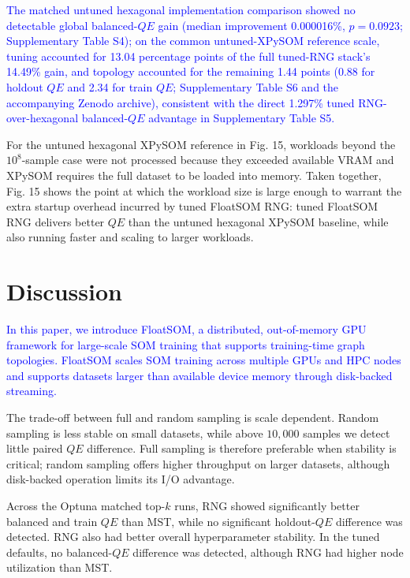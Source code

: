 \documentclass[10pt]{article} %
\newcommand{\TrackedChange}[1]{\textcolor{blue}{#1}}
\begin{document}
\TrackedChange{The matched untuned hexagonal implementation comparison showed no detectable global balanced-$QE$ gain (median improvement 0.000016\%, $p=0.0923$; Supplementary Table S4); on the common untuned-XPySOM reference scale, tuning accounted for 13.04 percentage points of the full tuned-RNG stack's 14.49\% gain, and topology accounted for the remaining 1.44 points (0.88 for holdout $QE$ and 2.34 for train $QE$; Supplementary Table S6 and the accompanying Zenodo archive), consistent with the direct 1.297\% tuned RNG-over-hexagonal balanced-$QE$ advantage in Supplementary Table S5.}

For the untuned hexagonal XPySOM reference in Fig. 15, workloads beyond the $10^8$-sample case were not processed because they exceeded available VRAM and XPySOM requires the full dataset to be loaded into memory. Taken together, Fig. 15 shows the point at which the workload size is large enough to warrant the extra startup overhead incurred by tuned FloatSOM RNG: tuned FloatSOM RNG delivers better $QE$ than the untuned hexagonal XPySOM baseline, while also running faster and scaling to larger workloads.

\section{Discussion}

\TrackedChange{In this paper, we introduce FloatSOM, a distributed, out-of-memory GPU framework for large-scale SOM training that supports training-time graph topologies. FloatSOM scales SOM training across multiple GPUs and HPC nodes and supports datasets larger than available device memory through disk-backed streaming.}

The trade-off between full and random sampling is scale dependent. Random sampling is less stable on small datasets, while above $10{,}000$ samples we detect little paired $QE$ difference. Full sampling is therefore preferable when stability is critical; random sampling offers higher throughput on larger datasets, although disk-backed operation limits its I/O advantage.

Across the Optuna matched top-$k$ runs, RNG showed significantly better balanced and train $QE$ than MST, while no significant holdout-$QE$ difference was detected. RNG also had better overall hyperparameter stability. In the tuned defaults, no balanced-$QE$ difference was detected, although RNG had higher node utilization than MST.
\end{document}
